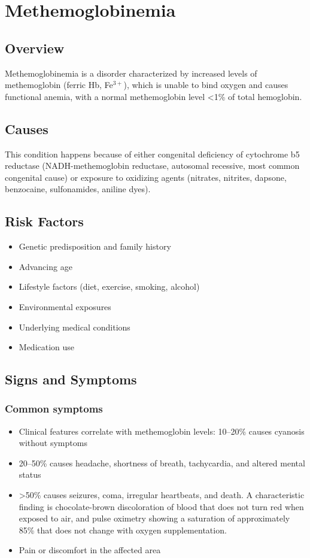 \chapter{Methemoglobinemia}
\label{sec:Methemoglobinemia}

\section{Overview}
Methemoglobinemia is a disorder characterized by increased levels of methemoglobin (ferric Hb, Fe$^{3+}$), which is unable to bind oxygen and causes functional anemia, with a normal methemoglobin level <1\% of total hemoglobin.
\section{Causes}
This condition happens because of either congenital deficiency of cytochrome b5 reductase (NADH-methemoglobin reductase, autosomal recessive, most common congenital cause) or exposure to oxidizing agents (nitrates, nitrites, dapsone, benzocaine, sulfonamides, aniline dyes).     
\section{Risk Factors}

\begin{itemize}[noitemsep]
  \item Genetic predisposition and family history
  \item Advancing age
  \item Lifestyle factors (diet, exercise, smoking, alcohol)
  \item Environmental exposures
  \item Underlying medical conditions
  \item Medication use
\end{itemize}
\section{Signs and Symptoms}

\subsection{Common symptoms}
\begin{itemize}[noitemsep]
  \item Clinical features correlate with methemoglobin levels: 10--20\% causes cyanosis without symptoms
  \item 20--50\% causes headache, shortness of breath, tachycardia, and altered mental status
  \item >50\% causes seizures, coma, irregular heartbeats, and death. A characteristic finding is chocolate-brown discoloration of blood that does not turn red when exposed to air, and pulse oximetry showing a saturation of approximately 85\% that does not change with oxygen supplementation.
  \item Pain or discomfort in the affected area
  \end{itemize}

